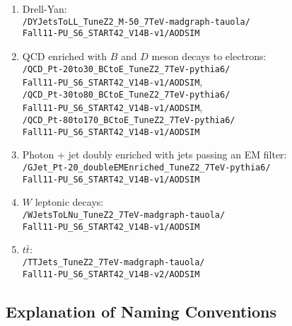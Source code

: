 \documentclass[dissertation.tex]{subfiles}
\begin{document}
\begin{enumerate}
\item Drell-Yan:\\\verb+/DYJetsToLL_TuneZ2_M-50_7TeV-madgraph-tauola/+\\\verb+Fall11-PU_S6_START42_V14B-v1/AODSIM+
\item QCD enriched with $B$ and $D$ meson decays to electrons:\\\verb+/QCD_Pt-20to30_BCtoE_TuneZ2_7TeV-pythia6/+\\\verb+Fall11-PU_S6_START42_V14B-v1/AODSIM+,\\\verb+/QCD_Pt-30to80_BCtoE_TuneZ2_7TeV-pythia6/+\\\verb+Fall11-PU_S6_START42_V14B-v1/AODSIM+,\\\verb+/QCD_Pt-80to170_BCtoE_TuneZ2_7TeV-pythia6/+\\\verb+Fall11-PU_S6_START42_V14B-v1/AODSIM+
\item Photon + jet doubly enriched with jets passing an EM filter:\\\verb+/GJet_Pt-20_doubleEMEnriched_TuneZ2_7TeV-pythia6/+\\\verb+Fall11-PU_S6_START42_V14B-v1/AODSIM+
\item $W$ leptonic decays:\\\verb+/WJetsToLNu_TuneZ2_7TeV-madgraph-tauola/+\\\verb+Fall11-PU_S6_START42_V14B-v1/AODSIM+
\item $t\bar{t}$:\\\verb+/TTJets_TuneZ2_7TeV-madgraph-tauola/+\\\verb+Fall11-PU_S6_START42_V14B-v2/AODSIM+
\end{enumerate}

\subsection{Explanation of Naming Conventions}
\label{sec:Explanation of Naming Conventions}
\end{document}
